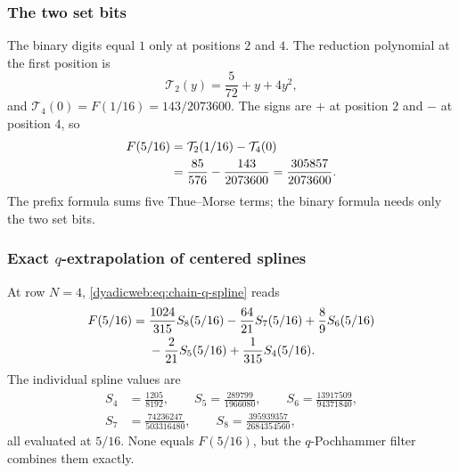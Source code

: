 \documentclass[11pt,oneside]{article}
\theoremstyle{definition}
\theoremstyle{remark}
\begin{document}
\subsubsection{The two set bits}

The binary digits equal $1$ only at positions $2$ and $4$.  The reduction polynomial at the
first position is
\begin{equation}
 \mathcal T_2(y)=\frac5{72}+y+4y^2,                        \label{dyadicweb:eq:T2-explicit}
\end{equation}
and
\(
 \mathcal T_4(0)=F(1/16)=143/2073600.
\)
The signs are $+$ at position $2$ and $-$ at position $4$, so
\begin{align}
 F(5/16)
 &=\mathcal T_2(1/16)-\mathcal T_4(0)                     \notag\\
 &=\frac{85}{576}-\frac{143}{2073600}
 =\frac{305857}{2073600}.                                 \label{dyadicweb:eq:five-sixteen-binary}
\end{align}
The prefix formula sums five Thue--Morse terms; the binary formula needs only the two set bits.

\subsubsection[Exact q-extrapolation of centered splines]{Exact $q$-extrapolation of centered splines}

At row $N=4$, \eqref{dyadicweb:eq:chain-q-spline} reads
\begin{align}
 F(5/16)
 ={}&\frac{1024}{315}S_8(5/16)
 -\frac{64}{21}S_7(5/16)
 +\frac89S_6(5/16)                                      \notag\\
 &-\frac2{21}S_5(5/16)
 +\frac1{315}S_4(5/16).                                  \label{dyadicweb:eq:five-sixteen-q-extrap}
\end{align}
The individual spline values are
\begin{equation}
 \begin{split}
 S_4&=\frac{1205}{8192},\qquad
 S_5=\frac{289799}{1966080},\qquad
 S_6=\frac{13917509}{94371840},\\
 S_7&=\frac{74236247}{503316480},\qquad
 S_8=\frac{395939357}{2684354560},
 \end{split}                                               \label{dyadicweb:eq:five-sixteen-S4-S8}
\end{equation}
all evaluated at $5/16$.  None equals $F(5/16)$, but the $q$-Pochhammer filter combines them
exactly.
\end{document}

